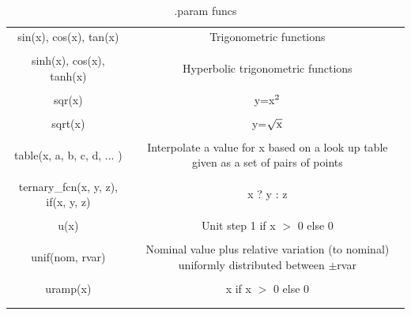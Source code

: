 \begin{longtable}{c c}
sin(x), cos(x), tan(x) & \begin{minipage}{20em}
Trigonometric functions
\end{minipage}\\ \\

sinh(x), cos(x), tanh(x) & \begin{minipage}{20em}
Hyperbolic trigonometric functions
\end{minipage}\\ \\

sqr(x) & \begin{minipage}{20em}
y=x$\rm{^2}$
\end{minipage}\\ \\

sqrt(x) & \begin{minipage}{20em}
y=$\sqrt{\rm{x}}$
\end{minipage}\\ \\

table(x, a, b, c, d, ... ) & \begin{minipage}{20em}
Interpolate a value for x based on a look up table given as a set of pairs of points
\end{minipage}\\ \\

ternary\_fcn(x, y, z), if(x, y, z) & \begin{minipage}{20em}
x ? y : z
\end{minipage}\\ \\

u(x) & \begin{minipage}{20em}
Unit step 1 if x $>$ 0 else 0
\end{minipage}\\ \\

unif(nom, rvar) & \begin{minipage}{20em}
Nominal value plus relative variation (to nominal) uniformly distributed between $\pm$rvar
\end{minipage}\\ \\

uramp(x) & \begin{minipage}{20em}
x if x $>$ 0 else 0
\end{minipage}\\ \\[1ex] %
\hline %

\caption{.param funcs}
\label {tab:paramfuncs}
\end{longtable}

